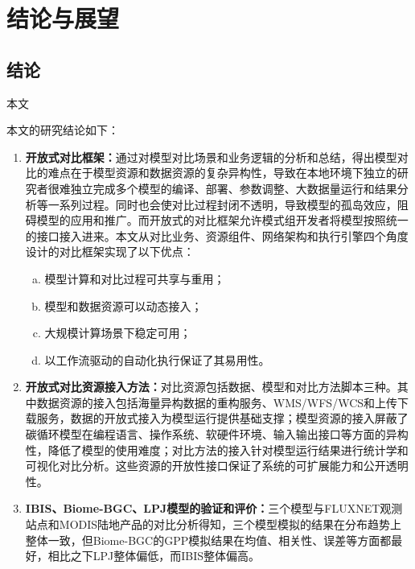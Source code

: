 \chapter{结论与展望}

\section{结论}
本文

本文的研究结论如下：
\renewcommand{\labelenumii}{\theenumii}
\renewcommand{\theenumii}{\theenumi.\arabic{enumii}.}
\begin{enumerate}[(1)]
    \item \textbf{开放式对比框架：}通过对模型对比场景和业务逻辑的分析和总结，得出模型对比的难点在于模型资源和数据资源的复杂异构性，导致在本地环境下独立的研究者很难独立完成多个模型的编译、部署、参数调整、大数据量运行和结果分析等一系列过程。同时也会使对比过程封闭不透明，导致模型的孤岛效应，阻碍模型的应用和推广。而开放式的对比框架允许模式组开发者将模型按照统一的接口接入进来。本文从对比业务、资源组件、网络架构和执行引擎四个角度设计的对比框架实现了以下优点：
        \begin{enumerate}[a)]
            \item 模型计算和对比过程可共享与重用；
            \item 模型和数据资源可以动态接入；
            \item 大规模计算场景下稳定可用；
            \item 以工作流驱动的自动化执行保证了其易用性。
        \end{enumerate}
    \item \textbf{开放式对比资源接入方法：}对比资源包括数据、模型和对比方法脚本三种。其中数据资源的接入包括海量异构数据的重构服务、WMS/WFS/WCS和上传下载服务，数据的开放式接入为模型运行提供基础支撑；模型资源的接入屏蔽了碳循环模型在编程语言、操作系统、软硬件环境、输入输出接口等方面的异构性，降低了模型的使用难度；对比方法的接入针对模型运行结果进行统计学和可视化对比分析。这些资源的开放性接口保证了系统的可扩展能力和公开透明性。
    \item \textbf{IBIS、Biome-BGC、LPJ模型的验证和评价：}三个模型与FLUXNET观测站点和MODIS陆地产品的对比分析得知，三个模型模拟的结果在分布趋势上整体一致，但Biome-BGC的GPP模拟结果在均值、相关性、误差等方面都最好，相比之下LPJ整体偏低，而IBIS整体偏高。
\end{enumerate}


